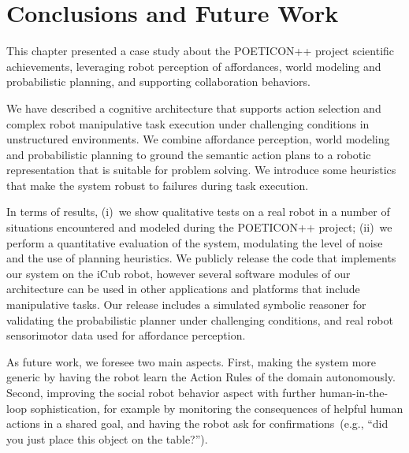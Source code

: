 \section{Conclusions and Future Work}
\label{sec:poeticon++:conclusions}

This chapter presented a case study about the POETICON++ project scientific achievements, leveraging robot perception of affordances, world modeling and probabilistic planning, and supporting \hr{} collaboration behaviors.

We have described a cognitive architecture that supports action selection and complex robot manipulative task execution under challenging conditions in unstructured environments.
We combine affordance perception, world modeling and probabilistic planning to ground the semantic action plans to a robotic representation that is suitable for problem solving.
We introduce some heuristics that make the system robust to failures during task execution.

In terms of results,
(i)~we show qualitative tests on a real robot in a number of situations encountered and modeled during the POETICON++ project;
(ii)~we perform a quantitative evaluation of the system, modulating the level of noise and the use of planning heuristics.
We publicly release the code that implements our system on the iCub robot, however several software modules of our architecture can be used in other applications and platforms that include manipulative tasks.
Our release includes a simulated symbolic reasoner for validating the probabilistic planner under challenging conditions, and real robot sensorimotor data used for affordance perception.

As future work, we foresee two main aspects.
First, making the system more generic by having the robot learn the Action Rules of the domain autonomously.
Second, improving the social robot behavior aspect with further human-in-the-loop sophistication, for example by monitoring the consequences of helpful human actions in a shared \hr{} goal, and having the robot ask for confirmations~(e.g., ``did you just place this object on the table?'').

